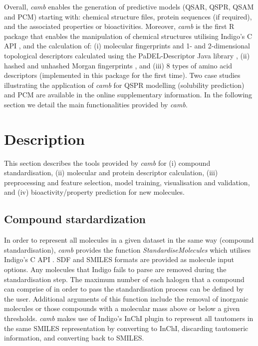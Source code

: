 \documentclass{bioinfo}
\begin{document}
Overall, {\it camb} enables the generation of predictive  models (QSAR, QSPR, QSAM and PCM)
starting with: chemical structure files, protein sequences (if required), and the associated properties or bioactivities.
Moreover, {\it camb} is the first R package that enables the manipulation of chemical structures utilising Indigo's C API \citep{Indigo},
and the calculation of:
(i) molecular fingerprints and 1- and 2-dimensional topological descriptors calculated using the PaDEL-Descriptor Java library \citep{padel},
(ii) hashed and unhashed Morgan fingerprints \citep{extended_fp},
and (iii) 8 types of amino acid descriptors (implemented in this package for the first time). 
Two case studies illustrating the application of {\it camb} for
QSPR modelling (solubility prediction) and PCM are available in the online supplementary information.
In the following section we detail the main functionalities provided by {\it camb}. 

\section{Description}
This section describes the tools provided by {\it camb} 
for (i) compound standardisation, (ii) molecular and protein descriptor calculation, 
(iii) preprocessing and feature selection, model training, visualisation and validation, and (iv) bioactivity/property prediction for new molecules.	

\subsection{Compound stardardization}

In order to represent all molecules in a given dataset in the same 
way (compound standardisation),
{\it camb}  provides the function {\it StandardiseMolecules} which utilises Indigo's C API \citep{Indigo}.
SDF and SMILES formats are provided as molecule input options. Any molecules that Indigo fails to parse are removed during the standardisation step.
The maximum number of each halogen that a compound can comprise of in order to pass the standardisation process can be defined by the user.
Additional arguments of this function include the removal of inorganic molecules
or those compounds with a molecular mass above or below a given thresholds.
{\it camb} makes use of Indigo's InChI \citep{inchi} plugin to represent all tautomers in the same SMILES representation
by converting to InChI, discarding tautomeric information, and converting back to SMILES.  
\end{document}
